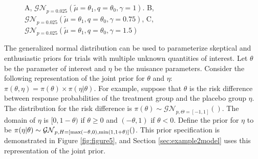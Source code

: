 \documentclass[useAMS,usenatbib,referee]{biom}
\begin{document}
\begin{figure}
\begin{center}
\caption{A, $\mathcal{GN}_{p=0.025}(\tilde{\mu}=\theta_1,q=\theta_0,\gamma=1)$. B, $\mathcal{GN}_{p=0.025}(\tilde{\mu}=\theta_1,q=\theta_0,\gamma=0.75)$, C, $\mathcal{GN}_{p=0.025}(\tilde{\mu}=\theta_1,q=\theta_0,\gamma=1.5)$}
\label{fig:figure1}
\end{center}
\end{figure}

The generalized normal distribution can be used to parameterize skeptical and enthusiastic priors for trials with multiple unknown quantities of interest. Let $\theta$ be the parameter of interest and $\eta$ be the nuisance parameters. Consider the following representation of the joint prior for $\theta$ and $\eta$: $\pi(\theta,\eta)=\pi(\theta)\times\pi(\eta|\theta)$. For example, suppose that $\theta$ is the risk difference between response probabilities of the treatment group and the placebo group $\eta$. The distribution for the risk difference is $
\pi(\theta)\sim\mathcal{GN}_{p,\Theta=[-1,1]}()$. The domain of $\eta$ is $[0,1-\theta)$ if $\theta\geq 0$ and $(-\theta,1)$ if $\theta < 0$. Define the prior for $\eta$ to be $\pi(\eta|\theta)\sim \mathcal{GN}_{p,H=[{\mathrm{max}}(-\theta,0),{\mathrm{min}}(1,1+\theta)]}()$. This prior specification is demonstrated in Figure \ref{fig:figure5}, and Section \ref{sec:example2model} uses this representation of the joint prior.
\end{document}
